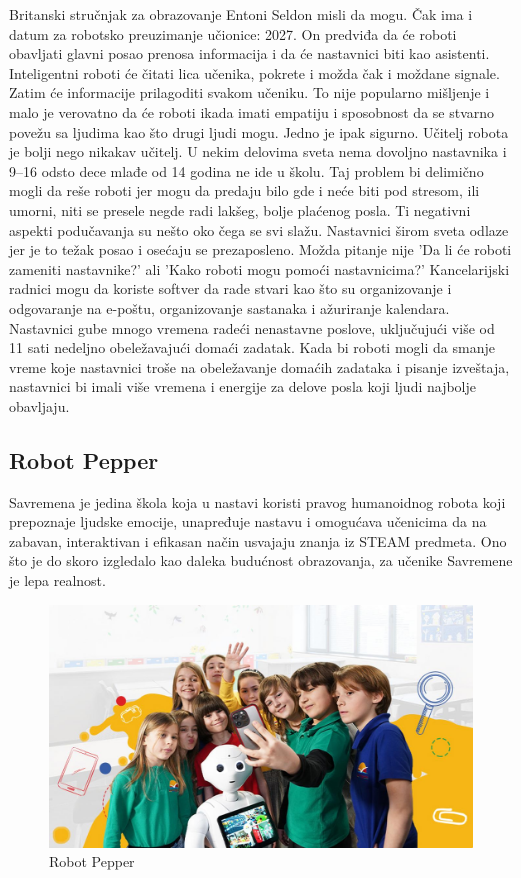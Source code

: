 \documentclass[a4paper]{article}
\begin{document}
Britanski stručnjak za obrazovanje Entoni Seldon misli da mogu. Čak ima i datum za robotsko preuzimanje učionice: 2027. On predviđa da će roboti obavljati glavni posao prenosa informacija i da će nastavnici biti kao asistenti. Inteligentni roboti će čitati lica učenika, pokrete i možda čak i moždane signale. Zatim će informacije prilagoditi svakom učeniku. To nije popularno mišljenje i malo je verovatno da će roboti ikada imati empatiju i sposobnost da se stvarno povežu sa ljudima kao što drugi ljudi mogu.
Jedno je ipak sigurno. Učitelj robota je bolji nego nikakav učitelj. U nekim delovima sveta nema dovoljno nastavnika i 9–16 odsto dece mlađe od 14 godina ne ide u školu. Taj problem bi delimično mogli da reše roboti jer mogu da predaju bilo gde i neće biti pod stresom, ili umorni, niti se presele negde radi lakšeg, bolje plaćenog posla.
Ti negativni aspekti podučavanja su nešto oko čega se svi slažu. Nastavnici širom sveta odlaze jer je to težak posao i osećaju se prezaposleno. Možda pitanje nije 'Da li će roboti zameniti nastavnike?' ali 'Kako roboti mogu pomoći nastavnicima?' Kancelarijski radnici mogu da koriste softver da rade stvari kao što su organizovanje i odgovaranje na e-poštu, organizovanje sastanaka i ažuriranje kalendara. Nastavnici gube mnogo vremena radeći nenastavne poslove, uključujući više od 11 sati nedeljno obeležavajući domaći zadatak. Kada bi roboti mogli da smanje vreme koje nastavnici troše na obeležavanje domaćih zadataka i pisanje izveštaja, nastavnici bi imali više vremena i energije za delove posla koji ljudi najbolje obavljaju.

\subsection{Robot Pepper}
Savremena je jedina škola koja u nastavi koristi pravog humanoidnog robota koji prepoznaje ljudske emocije, unapređuje nastavu i omogućava učenicima da na zabavan, interaktivan i efikasan način usvajaju znanja iz STEAM predmeta.
Ono što je do skoro izgledalo kao daleka budućnost obrazovanja, za učenike Savremene je lepa realnost.

\begin{figure}[h!]
\begin{center}
\includegraphics[scale=0.25]{peper.jpg}
\end{center}
\caption{Robot Pepper}
\label{fig:robotpepper}
\end{figure}
\end{document}

